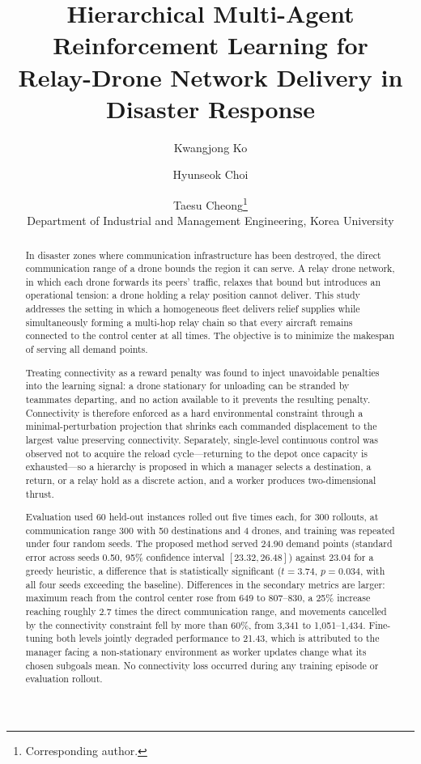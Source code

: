 \documentclass[12pt]{article}
\title{Hierarchical Multi-Agent Reinforcement Learning for\\
Relay-Drone Network Delivery in Disaster Response}
\author{Kwangjong Ko \and Hyunseok Choi \and Taesu Cheong\thanks{Corresponding author.}\\
Department of Industrial and Management Engineering, Korea University}
\date{}
\begin{document}
\maketitle

\begin{abstract}
In disaster zones where communication infrastructure has been destroyed, the direct communication
range of a drone bounds the region it can serve. A relay drone network, in which each drone
forwards its peers' traffic, relaxes that bound but introduces an operational tension: a drone
holding a relay position cannot deliver. This study addresses the setting in which a homogeneous
fleet delivers relief supplies while simultaneously forming a multi-hop relay chain so that every
aircraft remains connected to the control center at all times. The objective is to minimize the
makespan of serving all demand points.

Treating connectivity as a reward penalty was found to inject unavoidable penalties into the
learning signal: a drone stationary for unloading can be stranded by teammates departing, and no
action available to it prevents the resulting penalty. Connectivity is therefore enforced as a
hard environmental constraint through a minimal-perturbation projection that shrinks each commanded
displacement to the largest value preserving connectivity. Separately, single-level continuous
control was observed not to acquire the reload cycle---returning to the depot once capacity is
exhausted---so a hierarchy is proposed in which a manager selects a destination, a return, or a
relay hold as a discrete action, and a worker produces two-dimensional thrust.

Evaluation used 60 held-out instances rolled out five times each, for 300 rollouts, at
communication range 300 with 50 destinations and 4 drones, and training was repeated under four
random seeds. The proposed method served 24.90 demand points (standard error across seeds 0.50,
95\% confidence interval $[23.32, 26.48]$) against 23.04 for a greedy heuristic, a difference that
is statistically significant ($t=3.74$, $p=0.034$, with all four seeds exceeding the baseline).
Differences in the secondary metrics are larger: maximum reach from the control center rose from
649 to 807--830, a 25\% increase reaching roughly 2.7 times the direct communication range, and
movements cancelled by the connectivity constraint fell by more than 60\%, from 3,341 to
1,051--1,434. Fine-tuning both levels jointly degraded performance to 21.43, which is attributed
to the manager facing a non-stationary environment as worker updates change what its chosen
subgoals mean. No connectivity loss occurred during any training episode or evaluation rollout.
\end{abstract}
\end{document}
